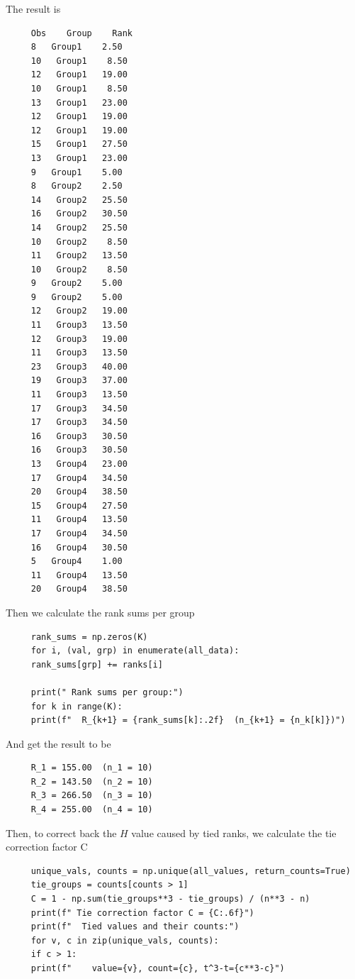 \documentclass[letterpaper]{article}
\begin{document}
The result is 

\begin{minipage}{\linewidth}
	\begin{Verbatim}
     Obs    Group    Rank
     8   Group1    2.50
     10   Group1    8.50
     12   Group1   19.00
     10   Group1    8.50
     13   Group1   23.00
     12   Group1   19.00
     12   Group1   19.00
     15   Group1   27.50
     13   Group1   23.00
     9   Group1    5.00
     8   Group2    2.50
     14   Group2   25.50
     16   Group2   30.50
     14   Group2   25.50
     10   Group2    8.50
     11   Group2   13.50
     10   Group2    8.50
     9   Group2    5.00
     9   Group2    5.00
     12   Group2   19.00
     11   Group3   13.50
     12   Group3   19.00
     11   Group3   13.50
     23   Group3   40.00
     19   Group3   37.00
     11   Group3   13.50
     17   Group3   34.50
     17   Group3   34.50
     16   Group3   30.50
     16   Group3   30.50
     13   Group4   23.00
     17   Group4   34.50
     20   Group4   38.50
     15   Group4   27.50
     11   Group4   13.50
     17   Group4   34.50
     16   Group4   30.50
     5   Group4    1.00
     11   Group4   13.50
     20   Group4   38.50
	\end{Verbatim}
\end{minipage}

Then we calculate the rank sums per group

\begin{lstlisting}
     rank_sums = np.zeros(K)
     for i, (val, grp) in enumerate(all_data):
     rank_sums[grp] += ranks[i]
     
     print(" Rank sums per group:")
     for k in range(K):
     print(f"  R_{k+1} = {rank_sums[k]:.2f}  (n_{k+1} = {n_k[k]})")
\end{lstlisting}

And get the result to be 

\begin{minipage}{\linewidth}
	\begin{Verbatim}
     R_1 = 155.00  (n_1 = 10)
     R_2 = 143.50  (n_2 = 10)
     R_3 = 266.50  (n_3 = 10)
     R_4 = 255.00  (n_4 = 10)
	\end{Verbatim}
\end{minipage}

Then, to correct back the $H$ value caused  by tied ranks, we calculate the tie correction factor C

\begin{lstlisting}
     unique_vals, counts = np.unique(all_values, return_counts=True)
     tie_groups = counts[counts > 1]
     C = 1 - np.sum(tie_groups**3 - tie_groups) / (n**3 - n)
     print(f" Tie correction factor C = {C:.6f}")
     print(f"  Tied values and their counts:")
     for v, c in zip(unique_vals, counts):
     if c > 1:
     print(f"    value={v}, count={c}, t^3-t={c**3-c}")
\end{lstlisting}
\end{document}

